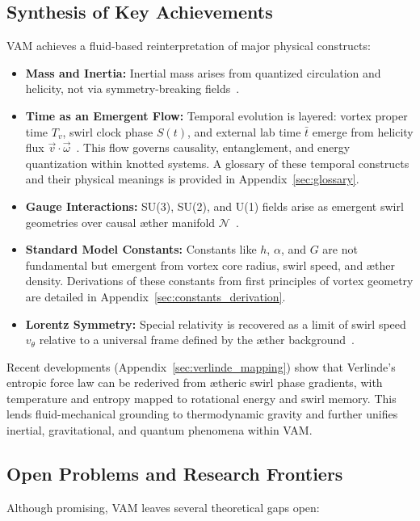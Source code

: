 \documentclass[12pt]{article}
\begin{document}
    \subsection{Synthesis of Key Achievements}
    VAM achieves a fluid-based reinterpretation of major physical constructs:

    \begin{itemize}
        \item \textbf{Mass and Inertia:} Inertial mass arises from quantized circulation and helicity, not via symmetry-breaking fields~\cite{kleckner2013creation,volovik2003universe}.
        \item \textbf{Time as an Emergent Flow:} Temporal evolution is layered: vortex proper time $T_v$, swirl clock phase $S(t)$, and external lab time $\bar{t}$ emerge from helicity flux $\vec{v} \cdot \vec{\omega}$~\cite{volovik2003universe, ranada1990topological}. This flow governs causality, entanglement, and energy quantization within knotted systems. A glossary of these temporal constructs and their physical meanings is provided in Appendix~\ref{sec:glossary}.
        \item \textbf{Gauge Interactions:} SU(3), SU(2), and U(1) fields arise as emergent swirl geometries over causal æther manifold $\mathcal{N}$~\cite{moffatt1969knottedness}.
        \item \textbf{Standard Model Constants:} Constants like $h$, $\alpha$, and $G$ are not fundamental but emergent from vortex core radius, swirl speed, and æther density.     Derivations of these constants from first principles of vortex geometry are detailed in Appendix~\ref{sec:constants_derivation}.
        \item \textbf{Lorentz Symmetry:} Special relativity is recovered as a limit of swirl speed $v_\theta$ relative to a universal frame defined by the æther background~\cite{volovik2003universe}.
    \end{itemize}

        Recent developments (Appendix~\ref{sec:verlinde_mapping}) show that Verlinde’s entropic force law can be rederived from ætheric swirl phase gradients, with temperature and entropy mapped to rotational energy and swirl memory. This lends fluid-mechanical grounding to thermodynamic gravity and further unifies inertial, gravitational, and quantum phenomena within VAM.

    \subsection{Open Problems and Research Frontiers}
    Although promising, VAM leaves several theoretical gaps open:
\end{document}
